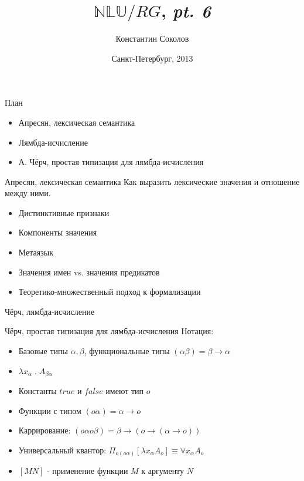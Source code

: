\documentclass{beamer}
\begin{document}
\title{\huge{$\mathbb{NLU}/RG$, \textit{pt. 6}}}
\author{Константин Соколов}
\date{Санкт-Петербург, 2013} 
\begin{frame}
    \thispagestyle{empty}
    \titlepage
\end{frame}

\begin{frame}{План}
    \setcounter{framenumber}{1}
    \begin{itemize}
        \item Апресян, лексическая семантика
        \item Лямбда-исчисление
        \item А. Чёрч, простая типизация для лямбда-исчисления
    \end{itemize}
\end{frame}

\begin{frame}{Апресян, лексическая семантика}
Как выразить лексические значения и отношение между ними.\\
\bigskip
\begin{itemize}
  \item Дистинктивные признаки
  \item Компоненты значения
  \item Метаязык
  \item Значения имен vs. значения предикатов
  \item Теоретико-множественный подход к формализации
\end{itemize}
\end{frame}

\begin{frame}{Чёрч, лямбда-исчисление}
\end{frame}

\begin{frame}{Чёрч, простая типизация для лямбда-исчисления}
Нотация:\\
\bigskip
\begin{itemize}
  \item Базовые типы $\alpha, \beta$, функциональные типы $(\alpha\beta) = \beta \to \alpha$
  \item $\lambda x_\alpha \; . \; A_{\beta\alpha}$
  \item Константы $true$ и $false$ имеют тип $o$
  \item Функции с типом $(o\alpha) = \alpha \to o$
  \item Каррирование: $(o\alpha o\beta) = \beta \to (o \to (\alpha \to o))$
  \item Универсальный квантор: $\Pi_{o(o\alpha)}[\lambda x_\alpha A_o] \equiv \forall x_\alpha A_o$
  \item $[MN]$ - применение функции $M$ к аргументу $N$
\end{itemize}
\end{frame}
\end{document}
